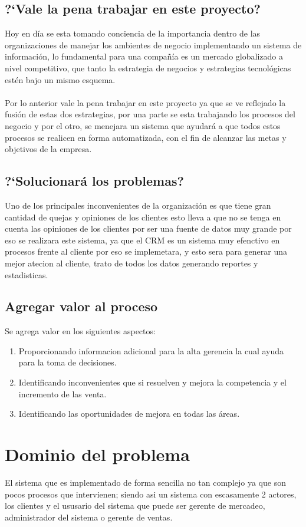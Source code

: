 \subsection{?`Vale la pena trabajar en este proyecto?}
Hoy en d\'ia se esta tomando conciencia de la importancia dentro de las organizaciones de manejar los ambientes de negocio implementando un sistema de informaci\'on, lo fundamental para una compa\~n\'ia es un mercado globalizado a nivel competitivo, que tanto la estrategia de negocios y estrategias tecnol\'ogicas est\'en bajo un mismo esquema.%
\\%
\\%
Por lo anterior vale la pena trabajar en este proyecto ya que se ve reflejado la fusi\'on de estas dos estrategias, por una parte se esta trabajando los procesos del negocio y por el otro, se menejara un sistema que ayudar\'a a que todos estos procesos se realicen en forma automatizada, con el fin de alcanzar las metas y objetivos de la empresa.%
%
\subsection{?`Solucionar\'a los problemas?}
Uno de los principales inconvenientes de la organizaci\'on es que tiene gran cantidad de quejas y opiniones de los clientes esto lleva a que no se tenga en cuenta las opiniones de los clientes por ser una fuente de datos muy grande por eso se realizara este sistema, ya que el CRM es un sistema muy efenctivo en procesos frente al cliente por eso se implemetara, y esto sera para generar una mejor atecion al cliente, trato de todos los datos generando reportes y estadisticas.%
%
\subsection{Agregar valor al proceso}
Se agrega valor en los siguientes aspectos:%
\begin{enumerate}
	\item Proporcionando informacion adicional para la alta gerencia la cual ayuda para la toma de decisiones.
	\item Identificando inconvenientes que si resuelven y mejora la competencia y el incremento de las venta.
	\item Identificando las oportunidades de mejora en todas las \'areas.
\end{enumerate}%
%
\section{Dominio del problema}
El sistema que es implementado de forma sencilla no tan complejo ya que son pocos procesos que intervienen; siendo asi un sistema con escasamente 2 actores, los clientes y el ususario del sistema que puede ser gerente de mercadeo, administrador del sistema o gerente de ventas.%
%
